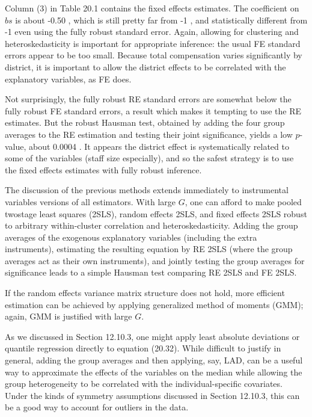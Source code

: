 \documentclass[10pt]{article}
\begin{document}
Column (3) in Table 20.1 contains the fixed effects estimates. The coefficient on $b s$ is about -0.50 , which is still pretty far from -1 , and statistically different from -1 even using the fully robust standard error. Again, allowing for clustering and heteroskedasticity is important for appropriate inference: the usual FE standard errors appear to be too small. Because total compensation varies significantly by district, it is important to allow the district effects to be correlated with the explanatory variables, as FE does.

Not surprisingly, the fully robust RE standard errors are somewhat below the fully robust FE standard errors, a result which makes it tempting to use the RE estimates. But the robust Hausman test, obtained by adding the four group averages to the RE estimation and testing their joint significance, yields a low $p$-value, about 0.0004 . It appears the district effect is systematically related to some of the variables (staff size especially), and so the safest strategy is to use the fixed effects estimates with fully robust inference.

The discussion of the previous methods extends immediately to instrumental variables versions of all estimators. With large $G$, one can afford to make pooled twostage least squares (2SLS), random effects 2SLS, and fixed effects 2SLS robust to arbitrary within-cluster correlation and heteroskedasticity. Adding the group averages of the exogenous explanatory variables (including the extra instruments), estimating the resulting equation by RE 2SLS (where the group averages act as their own instruments), and jointly testing the group averages for significance leads to a simple Hausman test comparing RE 2SLS and FE 2SLS.

If the random effects variance matrix structure does not hold, more efficient estimation can be achieved by applying generalized method of moments (GMM); again, GMM is justified with large $G$.

As we discussed in Section 12.10.3, one might apply least absolute deviations or quantile regression directly to equation (20.32). While difficult to justify in general, adding the group averages and then applying, say, LAD, can be a useful way to approximate the effects of the variables on the median while allowing the group heterogeneity to be correlated with the individual-specific covariates. Under the kinds of symmetry assumptions discussed in Section 12.10.3, this can be a good way to account for outliers in the data.
\end{document}
